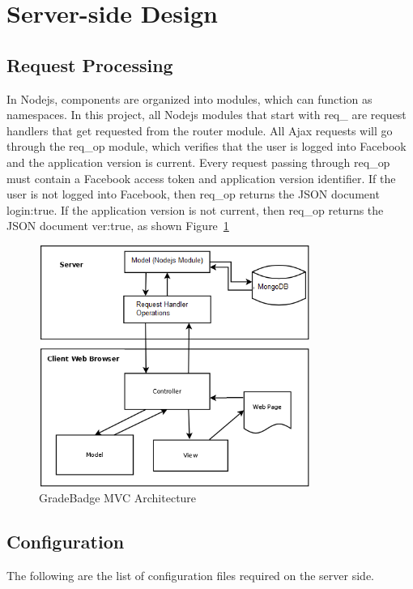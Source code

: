 \section{Server-side Design}

\subsection{Request Processing}
In Nodejs, components are organized into modules, which can function as namespaces. In this project, all Nodejs modules that start with req{\_} are request handlers that get requested from the router module. All Ajax requests will go through the req{\_}op module, which verifies that the user is logged into Facebook and the application version is current. Every request passing through req{\_}op must contain a Facebook access token and application version identifier. If the user is not logged into Facebook, then req{\_}op returns the JSON document {login:true}. If the application version is not current, then req{\_}op returns the JSON document {ver:true}, as shown Figure~\ref{fig:mvc}

\vspace{3em}
\begin{figure}[H]
\begin{center}
\includegraphics[height=3.1in,width=3.5in]{images/mvc_diagram.png}
\caption{GradeBadge MVC Architecture}
\label{fig:mvc}
\end{center}
\end{figure}   

\subsection{Configuration}
The following are the list of configuration files required on the server side.

